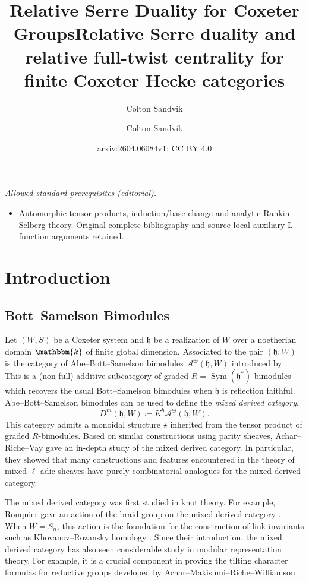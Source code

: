 \documentclass{amsart}
\title{Relative Serre Duality for Coxeter Groups}
\author{Colton Sandvik}
\date{}
\title{Relative Serre duality and relative full-twist centrality for finite Coxeter Hecke categories}
\author{Colton Sandvik}
\date{arxiv:2604.06084v1; CC BY 4.0}
\renewcommand{\k}{\mathbbm{k}}
\newcommand{\scrA}{\mathcal{A}}
\newcommand{\BE}{D^m}
\newcommand{\fr}[1]{\mathfrak{#1}}
\DeclareMathOperator{\Sym}{Sym}
\theoremstyle{definition}
\begin{document}
\maketitle
\noindent\textit{Allowed standard prerequisites (editorial).}\begin{itemize}
\item Automorphic tensor products, induction/base change and analytic Rankin-Selberg theory. Original complete bibliography and source-local auxiliary L-function arguments retained.
\end{itemize}\medskip
        \section{Introduction}

        \subsection{Bott--Samelson Bimodules}

        Let $(W,S)$ be a Coxeter system and $\fr{h}$ be a realization of $W$ over a noetherian domain $\k$ of finite global dimension.
        Associated to the pair $(\fr{h}, W)$ is the category of Abe--Bott--Samelson bimodules $\scrA^{\oplus} (\fr{h}, W)$ introduced by \cite{Abe19}.
        This is a (non-full) additive subcategory of graded $R = \Sym (\fr{h}^*)$-bimodules which recovers the usual Bott--Samelson bimodules when $\fr{h}$ is reflection faithful.
        Abe--Bott--Samelson bimodules can be used to define the \emph{mixed derived category},
        \[\BE (\fr{h}, W) \coloneq K^b \scrA^{\oplus} (\fr{h}, W).\]
        This category admits a monoidal structure $\star$ inherited from the tensor product of graded $R$-bimodules.
        Based on similar constructions using parity sheaves, Achar--Riche--Vay \cite{ARV} gave an in-depth study of the mixed derived category.
        In particular, they showed that many constructions and features encountered in the theory of mixed $\ell$-adic sheaves have purely combinatorial analogues for the mixed derived category.
        
        The mixed derived category was first studied in knot theory. For example, Rouquier gave an action of the braid group on the mixed derived category \cite{Rou}.
        When $W= S_n$, this action is the foundation for the construction of link invariants such as  Khovanov--Rozansky homology  \cite{Kho, KR}.
        Since their introduction, the mixed derived category has also seen considerable study in modular representation theory.
        For example, it is a crucial component in proving the tilting character formulas for reductive groups developed by Achar--Makisumi--Riche--Williamson \cite{AMRW}.
\end{document}
